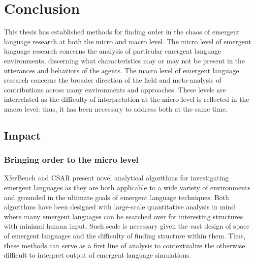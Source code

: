 \chapter{Conclusion}
\unskip\label{ch:conclusion}

This thesis has established methods for finding order in the chaos of emergent language research at both the micro and macro level.
The micro level of emergent language research concerns the analysis of particular emergent language environments, discerning what characteristics may or may not be present in the utterances and behaviors of the agents.
The macro level of emergent language research concerns the broader direction of the field and meta-analysis of contributions across many environments and approaches.
These levels are interrelated as the difficulty of interpretation at the micro level is reflected in the macro level;
  thus, it has been necessary to address both at the same time.

\section{Impact}

\subsection{Bringing order to the micro level}
XferBench and CSAR present novel analytical algorithms for investigating emergent languages as they are both applicable to a wide variety of environments and grounded in the ultimate goals of emergent language techniques.
Both algorithms have been designed with large-scale quantitative analysis in mind where many emergent languages can be searched over for interesting structures with minimal human input.
Such scale is necessary given the vast design of space of emergent languages and the difficulty of finding structure within them.
Thus, these methods can serve as a first line of analysis to contextualize the otherwise difficult to interpret output of emergent language simulations.



